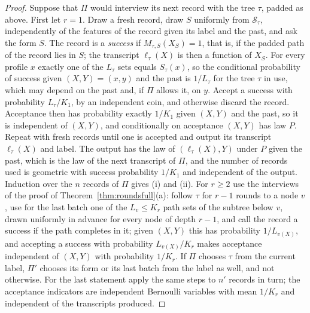 \begin{proof}
Suppose that $\Pi$ would interview its next record with the tree $\tau$,
padded as above. First let $r=1$. Draw a fresh record, draw $S$ uniformly
from $\mathcal S_\tau$, independently of the features of the record given its
label and the past, and ask the form $S$. The
record is a \emph{success} if $M_{\tau,S}(X_S)=1$, that is, if the padded
path of the record lies in $S$; the transcript $\ell_\tau(X)$ is then a
function of $X_S$. For every profile $x$ exactly one of the $L_\tau$ sets
equals $S_\tau(x)$, so the conditional probability of success given
$(X,Y)=(x,y)$ and the past is $1/L_\tau$ for the tree $\tau$ in use, which
may depend on the past and, if $\Pi$ allows it, on $y$. Accept a success with
probability $L_\tau/K_1$, by an independent coin, and otherwise discard the
record. Acceptance then has probability exactly $1/K_1$ given
$(X,Y)$ and the past, so it is independent of $(X,Y)$, and conditionally on
acceptance $(X,Y)$ has law $P$. Repeat with fresh records until one is
accepted and output its transcript $\ell_\tau(X)$ and label. The output has
the law of $(\ell_\tau(X),Y)$ under $P$ given the past, which is the law of
the next transcript of $\Pi$, and the number of records used is geometric with
success probability $1/K_1$ and independent of the output. Induction over the
$n$ records of $\Pi$ gives (i) and (ii). For $r\ge2$ use the interviews of the
proof of Theorem~\ref{thm:roundsfull}(a): follow $\tau$ for $r-1$ rounds to a
node $v$, use for the last batch one of the $L_v\le K_r$ path sets of the
subtree below $v$, drawn uniformly in advance for every node of depth $r-1$,
and call the record a success if the path completes in it; given
$(X,Y)$ this has probability $1/L_{v(X)}$, and accepting a success with
probability $L_{v(X)}/K_r$ makes acceptance independent of $(X,Y)$ with
probability $1/K_r$. If $\Pi$ chooses $\tau$ from the current label, $\Pi'$ chooses its form or
its last batch from the label as well, and not otherwise. For the last
statement apply the same steps to $n'$ records in turn;
the acceptance indicators are independent Bernoulli variables with mean
$1/K_r$ and independent of the transcripts produced.
\end{proof}

